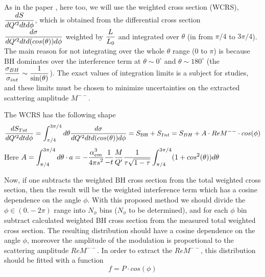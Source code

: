 \documentclass[letterpaper,12pt]{article}
\def\dfrac#1#2{\displaystyle{{#1}\over{#2}}}
\def \dstl {\displaystyle}
\begin{document}
As in the paper \cite{Berger:2001xd}, here too, we will use the weighted cross section (WCRS),
$\dfrac{dS}{dQ^{\prime 2} dt d\phi}$, which is obtained from the differential cross section $\dfrac{d\sigma}{dQ^{\prime 2}dt d(cos(\theta))d\phi}$ weighted by $\dfrac{L}{L_{0}}$ and integrated over $\theta$ (in \cite{Berger:2001xd} from $\pi/4$ to $3\pi/4$). The main reason for not integrating over the whole $\theta$ range ($0$ to $\pi$) is because BH dominates over the interference term at $\theta \sim 0^{\circ}$ and $\theta \sim 180^{\circ}$ (the $\dfrac{\sigma_{BH}}{\sigma_{int}}\sim \dfrac{1}{\sin(\theta)}$). The exact values of integration limits is a subject for studies, and these limits must be chosen to minimize uncertainties on the extracted scattering amplitude $M^{--}$.
 
 The WCRS has the following shape
 \begin{equation}
  \dfrac{dS_{Tot}}{dQ^{\prime 2} dt d\phi} = \int_{\pi/4}^{3\pi/4}d\theta \dfrac{d\sigma}{dQ^{\prime 2}dt d(cos(\theta))d\phi} = S_{\mathrm{BH}} + S_{Int} = S_{BH} + A\cdot Re M^{--}\cdot cos(\phi)
  \label{eq:weighted_crs}
 \end{equation}
 Here $A = \dstl \int_{\pi/4}^{3\pi/4}d\theta\cdot a = - \frac{\dstl \alpha_{em}^{3}}{\dstl 4\pi s^{2}} \dfrac{1}{-t}\dfrac{M}{Q^{\prime}}
\dfrac{1}{\tau\sqrt{1-\tau}} \int_{\pi/4}^{3\pi/4}(1 + cos^{2}(\theta))d\theta$

 Now, if one subtracts the weighted BH cross section from the total weighted cross section, then the result will be the weighted interference term which has a cosine dependence on the angle $\phi$.
 With this proposed method we should divide the $\phi\in(0. - 2\pi)$ range into $N_{\phi}$ bins ($N_{\phi}$ to be determined), and for each $\phi$ bin subtract calculated weighted BH cross section from the measured total weighted cross section. The resulting distribution should have a cosine dependence on the angle $\phi$, moreover the amplitude of the modulation is proportional to the scattering amplitude $ReM^{--}$. In order to extract the $ReM^{--}$, this distribution should be fitted with a function
 \begin{equation}
    f = P\cdot cos(\phi)
 \end{equation}
\end{document}
